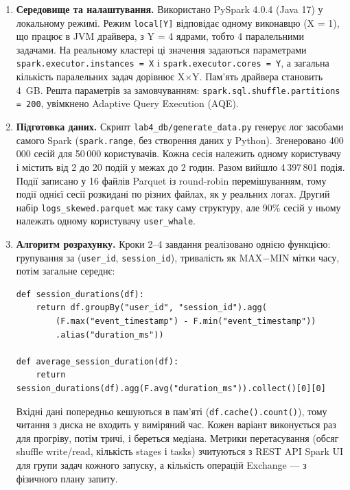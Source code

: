 \begin{enumerate}
  \item \textbf{Середовище та налаштування.} Використано PySpark 4.0.4 (Java 17) у локальному режимі. Режим \texttt{local[Y]} відповідає одному виконавцю (X = 1), що працює в JVM драйвера, з Y = 4 ядрами, тобто 4 паралельними задачами. На реальному кластері ці значення задаються параметрами \texttt{spark.executor.instances = X} і \texttt{spark.executor.cores = Y}, а загальна кількість паралельних задач дорівнює X\(\times\)Y. Пам'ять драйвера становить 4~GB. Решта параметрів за замовчуванням: \texttt{spark.sql.shuffle.partitions = 200}, увімкнено Adaptive Query Execution (AQE).

  \item \textbf{Підготовка даних.} Скрипт \texttt{lab4\_db/generate\_data.py} генерує лог засобами самого Spark (\texttt{spark.range}, без створення даних у Python). Згенеровано 400\,000 сесій для 50\,000 користувачів. Кожна сесія належить одному користувачу і містить від 2 до 20 подій у межах до 2 годин. Разом вийшло 4\,397\,801 подія. Події записано у 16 файлів Parquet із round-robin перемішуванням, тому події однієї сесії розкидані по різних файлах, як у реальних логах. Другий набір \texttt{logs\_skewed.parquet} має таку саму структуру, але 90\% сесій у ньому належать одному користувачу \texttt{user\_whale}.

  \item \textbf{Алгоритм розрахунку.} Кроки 2--4 завдання реалізовано однією функцією: групування за (\texttt{user\_id}, \texttt{session\_id}), тривалість як MAX\(-\)MIN мітки часу, потім загальне середнє:
\begin{Verbatim}
def session_durations(df):
    return df.groupBy("user_id", "session_id").agg(
        (F.max("event_timestamp") - F.min("event_timestamp"))
        .alias("duration_ms"))

def average_session_duration(df):
    return session_durations(df).agg(F.avg("duration_ms")).collect()[0][0]
\end{Verbatim}
  Вхідні дані попередньо кешуються в пам'яті (\texttt{df.cache().count()}), тому читання з диска не входить у виміряний час. Кожен варіант виконується раз для прогріву, потім тричі, і береться медіана. Метрики перетасування (обсяг shuffle write/read, кількість stages і tasks) зчитуються з REST API Spark UI для групи задач кожного запуску, а кількість операцій Exchange — з фізичного плану запиту.


\end{enumerate}
